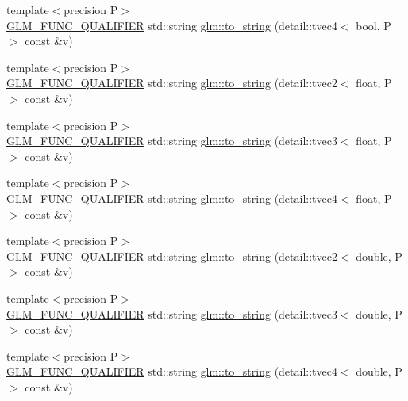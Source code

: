 \begin{DoxyCompactItemize}
\item 
{\footnotesize template$<$precision P$>$ }\\\hyperlink{setup_8hpp_a33fdea6f91c5f834105f7415e2a64407}{G\+L\+M\+\_\+\+F\+U\+N\+C\+\_\+\+Q\+U\+A\+L\+I\+F\+I\+ER} std\+::string \hyperlink{namespaceglm_a52849ff41e38c4cfcf17d832b3114450}{glm\+::to\+\_\+string} (detail\+::tvec4$<$ bool, P $>$ const \&v)
\item 
{\footnotesize template$<$precision P$>$ }\\\hyperlink{setup_8hpp_a33fdea6f91c5f834105f7415e2a64407}{G\+L\+M\+\_\+\+F\+U\+N\+C\+\_\+\+Q\+U\+A\+L\+I\+F\+I\+ER} std\+::string \hyperlink{namespaceglm_a6698c0d7c025b7261f4eb51b1baf7290}{glm\+::to\+\_\+string} (detail\+::tvec2$<$ float, P $>$ const \&v)
\item 
{\footnotesize template$<$precision P$>$ }\\\hyperlink{setup_8hpp_a33fdea6f91c5f834105f7415e2a64407}{G\+L\+M\+\_\+\+F\+U\+N\+C\+\_\+\+Q\+U\+A\+L\+I\+F\+I\+ER} std\+::string \hyperlink{namespaceglm_ada8090162e09080749f93e52ca6e1722}{glm\+::to\+\_\+string} (detail\+::tvec3$<$ float, P $>$ const \&v)
\item 
{\footnotesize template$<$precision P$>$ }\\\hyperlink{setup_8hpp_a33fdea6f91c5f834105f7415e2a64407}{G\+L\+M\+\_\+\+F\+U\+N\+C\+\_\+\+Q\+U\+A\+L\+I\+F\+I\+ER} std\+::string \hyperlink{namespaceglm_a0b90d4ba2c4c0d16a6bc71a80084a6d6}{glm\+::to\+\_\+string} (detail\+::tvec4$<$ float, P $>$ const \&v)
\item 
{\footnotesize template$<$precision P$>$ }\\\hyperlink{setup_8hpp_a33fdea6f91c5f834105f7415e2a64407}{G\+L\+M\+\_\+\+F\+U\+N\+C\+\_\+\+Q\+U\+A\+L\+I\+F\+I\+ER} std\+::string \hyperlink{namespaceglm_aacac89a227ca1a0dac8a43298ddccee5}{glm\+::to\+\_\+string} (detail\+::tvec2$<$ double, P $>$ const \&v)
\item 
{\footnotesize template$<$precision P$>$ }\\\hyperlink{setup_8hpp_a33fdea6f91c5f834105f7415e2a64407}{G\+L\+M\+\_\+\+F\+U\+N\+C\+\_\+\+Q\+U\+A\+L\+I\+F\+I\+ER} std\+::string \hyperlink{namespaceglm_a2192a3fcadf236a82f9cafe2291e5343}{glm\+::to\+\_\+string} (detail\+::tvec3$<$ double, P $>$ const \&v)
\item 
{\footnotesize template$<$precision P$>$ }\\\hyperlink{setup_8hpp_a33fdea6f91c5f834105f7415e2a64407}{G\+L\+M\+\_\+\+F\+U\+N\+C\+\_\+\+Q\+U\+A\+L\+I\+F\+I\+ER} std\+::string \hyperlink{namespaceglm_adc1be9dcab5836c228189fd8df32c4f2}{glm\+::to\+\_\+string} (detail\+::tvec4$<$ double, P $>$ const \&v)

\end{DoxyCompactItemize}
